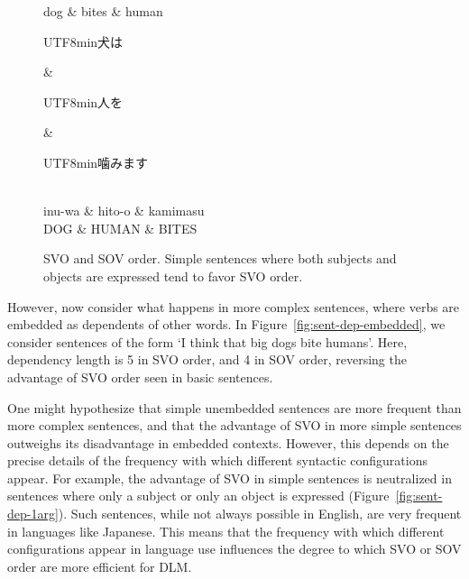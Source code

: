 \documentclass[11pt,a4paper]{article}
\newcommand{\japanese}[1]{\begin{CJK}{UTF8}{min}#1\end{CJK}}
\begin{document}
\begin{figure}
\begin{dependency}[theme = simple]
   \begin{deptext}[column sep=1em]
          dog \& bites \& human  \\
   \end{deptext}
\end{dependency}
\begin{dependency}[theme = simple]
   \begin{deptext}[column sep=1em]
   \japanese{犬は} \& \japanese{人を} \& \japanese{噛みます}\\ 
   inu-wa \& hito-o \& kamimasu \\
          DOG \& HUMAN \& BITES  \\
   \end{deptext}
\end{dependency}
        \caption{SVO and SOV order. Simple sentences where both subjects and objects are expressed tend to favor SVO order.}
        \label{fig:sent-dep}
\end{figure}

However, now consider what happens in more complex sentences, where verbs are embedded as dependents of other words.
In Figure~\ref{fig:sent-dep-embedded}, we consider sentences of the form `I think that big dogs bite humans'.
Here, dependency length is 5 in SVO order, and 4 in SOV order, reversing the advantage  of SVO order seen in basic sentences.

One might hypothesize that simple unembedded sentences are more frequent than more complex sentences, and that the advantage of SVO in more simple sentences outweighs its disadvantage in embedded contexts.
However, this depends on the precise details of the frequency with which different syntactic configurations appear.
For example, the advantage of SVO in simple sentences is neutralized in sentences where only a subject or only an object is expressed (Figure~\ref{fig:sent-dep-1arg}).
Such sentences, while not always possible in English, are very frequent in languages like Japanese.
This means that the frequency with which different configurations appear in language use influences the degree to which SVO or SOV order are more efficient for DLM.
\end{document}
